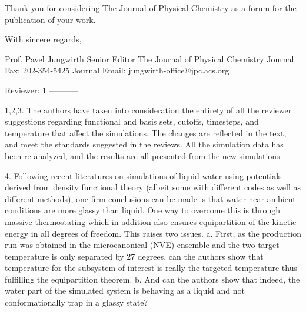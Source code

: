 Thank you for considering The Journal of Physical Chemistry as a forum for the publication of your work. 

With sincere regards, 

Prof. Pavel Jungwirth 
Senior Editor 
The Journal of Physical Chemistry 
Journal Fax: 202-354-5425 
Journal Email: jungwirth-office@jpc.acs.org 


Reviewer: 1 
-----------

1,2,3. The authors have taken into consideration the entirety of all the reviewer suggestions regarding functional and basis sets, cutoffs, timesteps, and temperature that affect the simulations. The changes are reflected in the text, and meet the standards suggested in the reviews. All the simulation data has been re-analyzed, and the results are all presented from the new simulations.



4. Following recent literatures on simulations of liquid water using potentials derived from density functional theory (albeit some with different codes as well as different methods), one firm conclusions can be made is that water near ambient conditions are more glassy than liquid. One way to overcome this is through massive thermostating which in addition also ensures equipartition of the kinetic energy in all degrees of freedom. This raises two issues.  a. First, as the production run was obtained in the microcanonical (NVE) ensemble and the two target temperature is only separated by 27 degrees, can the authors show that temperature for the subsystem of interest is really the targeted temperature thus fulfilling the equipartition theorem.  b. And can the authors show that indeed, the water part of the simulated system is behaving as a liquid and not conformationally trap in a glassy state? 

